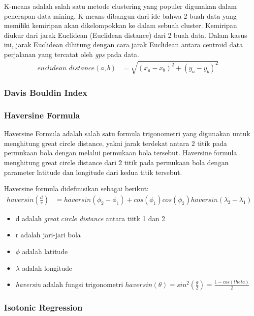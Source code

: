 \documentclass{article}
\begin{document}
K-means adalah salah satu metode clustering yang populer digunakan dalam penerapan data mining. K-means dibangun dari ide bahwa 2 buah data yang memiliki kemiripan akan dikelompokkan ke dalam sebuah cluster. Kemiripan diukur dari jarak Euclidean (Euclidean distance) dari 2 buah data. Dalam kasus ini, jarak Euclidean dihitung dengan cara jarak Euclidean antara centroid data perjalanan yang tercatat oleh \textit{gps} pada data.
\begin{align*}
	euclidean\_distance(a,b) &= \sqrt{(x_{a} - x_{b})^2 + (y_{a} - y_{b})^2}
\end{align*}

\subsubsection{Davis Bouldin Index}

\subsubsection{Haversine Formula}

Haversine Formula adalah salah satu formula trigonometri yang digunakan untuk menghitung great circle distance, yakni jarak terdekat antara 2 titik pada permukaan bola dengan melalui permukaan bola tersebut. Haversine formula menghitung great circle distance dari 2 titik pada permukaan bola dengan parameter latitude dan longitude dari kedua titik tersebut.

Haversine formula didefinisikan sebagai berikut:
\begin{align*}
haversin(\frac{d}{r}) &= haversin(\phi _{2} - \phi _{1}) + cos(\phi _{1})cos(\phi _{2})haversin(\lambda _{2} - \lambda _{1})
\end{align*}
\begin{itemize}
	\setlength{\itemindent}{1cm}
	\item{d adalah \textit{great circle distance} antara tiitk 1 dan 2}
	\item{r adalah jari-jari bola}
	\item{$\phi$ adalah latitude}
	\item{$\lambda$ adalah longitude}
	\item{\textit{haversin} adalah fungsi trigonometri $haversin(\theta) = sin^2(\frac{\theta}{2}) = \frac{1-cos(theta)}{2}$}
\end{itemize}

\subsubsection{Isotonic Regression}
\end{document}
